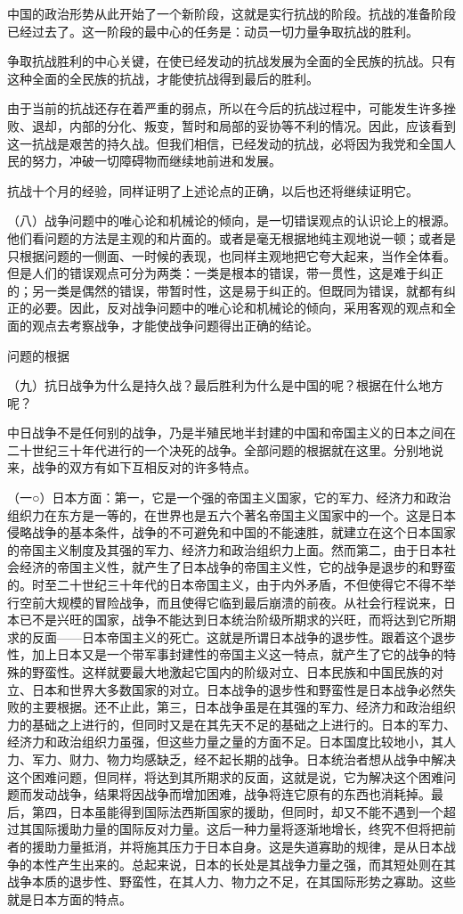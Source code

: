 \documentclass[UTF8, 12pt, a4paper]{ctexrep}
\begin{document}
中国的政治形势从此开始了一个新阶段，这就是实行抗战的阶段。抗战的准备阶段已经过去了。这一阶段的最中心的任务是：动员一切力量争取抗战的胜利。

争取抗战胜利的中心关键，在使已经发动的抗战发展为全面的全民族的抗战。只有这种全面的全民族的抗战，才能使抗战得到最后的胜利。

由于当前的抗战还存在着严重的弱点，所以在今后的抗战过程中，可能发生许多挫败、退却，内部的分化、叛变，暂时和局部的妥协等不利的情况。因此，应该看到这一抗战是艰苦的持久战。但我们相信，已经发动的抗战，必将因为我党和全国人民的努力，冲破一切障碍物而继续地前进和发展。

抗战十个月的经验，同样证明了上述论点的正确，以后也还将继续证明它。

（八）战争问题中的唯心论和机械论的倾向，是一切错误观点的认识论上的根源。他们看问题的方法是主观的和片面的。或者是毫无根据地纯主观地说一顿；或者是只根据问题的一侧面、一时候的表现，也同样主观地把它夸大起来，当作全体看。但是人们的错误观点可分为两类：一类是根本的错误，带一贯性，这是难于纠正的；另一类是偶然的错误，带暂时性，这是易于纠正的。但既同为错误，就都有纠正的必要。因此，反对战争问题中的唯心论和机械论的倾向，采用客观的观点和全面的观点去考察战争，才能使战争问题得出正确的结论。

问题的根据

（九）抗日战争为什么是持久战？最后胜利为什么是中国的呢？根据在什么地方呢？

中日战争不是任何别的战争，乃是半殖民地半封建的中国和帝国主义的日本之间在二十世纪三十年代进行的一个决死的战争。全部问题的根据就在这里。分别地说来，战争的双方有如下互相反对的许多特点。

（一○）日本方面：第一，它是一个强的帝国主义国家，它的军力、经济力和政治组织力在东方是一等的，在世界也是五六个著名帝国主义国家中的一个。这是日本侵略战争的基本条件，战争的不可避免和中国的不能速胜，就建立在这个日本国家的帝国主义制度及其强的军力、经济力和政治组织力上面。然而第二，由于日本社会经济的帝国主义性，就产生了日本战争的帝国主义性，它的战争是退步的和野蛮的。时至二十世纪三十年代的日本帝国主义，由于内外矛盾，不但使得它不得不举行空前大规模的冒险战争，而且使得它临到最后崩溃的前夜。从社会行程说来，日本已不是兴旺的国家，战争不能达到日本统治阶级所期求的兴旺，而将达到它所期求的反面——日本帝国主义的死亡。这就是所谓日本战争的退步性。跟着这个退步性，加上日本又是一个带军事封建性的帝国主义这一特点，就产生了它的战争的特殊的野蛮性。这样就要最大地激起它国内的阶级对立、日本民族和中国民族的对立、日本和世界大多数国家的对立。日本战争的退步性和野蛮性是日本战争必然失败的主要根据。还不止此，第三，日本战争虽是在其强的军力、经济力和政治组织力的基础之上进行的，但同时又是在其先天不足的基础之上进行的。日本的军力、经济力和政治组织力虽强，但这些力量之量的方面不足。日本国度比较地小，其人力、军力、财力、物力均感缺乏，经不起长期的战争。日本统治者想从战争中解决这个困难问题，但同样，将达到其所期求的反面，这就是说，它为解决这个困难问题而发动战争，结果将因战争而增加困难，战争将连它原有的东西也消耗掉。最后，第四，日本虽能得到国际法西斯国家的援助，但同时，却又不能不遇到一个超过其国际援助力量的国际反对力量。这后一种力量将逐渐地增长，终究不但将把前者的援助力量抵消，并将施其压力于日本自身。这是失道寡助的规律，是从日本战争的本性产生出来的。总起来说，日本的长处是其战争力量之强，而其短处则在其战争本质的退步性、野蛮性，在其人力、物力之不足，在其国际形势之寡助。这些就是日本方面的特点。
\end{document}
